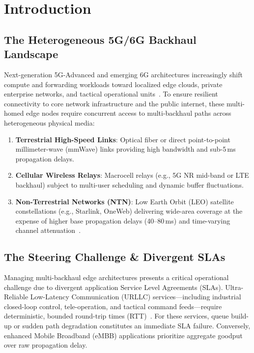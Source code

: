 \documentclass[conference]{IEEEtran}
\begin{document}
\section{Introduction}

\subsection{The Heterogeneous 5G/6G Backhaul Landscape}
Next-generation 5G-Advanced and emerging 6G architectures increasingly shift compute and forwarding workloads toward localized edge clouds, private enterprise networks, and tactical operational units~\cite{etsi_mec_003}. To ensure resilient connectivity to core network infrastructure and the public internet, these multi-homed edge nodes require concurrent access to multi-backhaul paths across heterogeneous physical media:
\begin{enumerate}
    \item \textbf{Terrestrial High-Speed Links}: Optical fiber or direct point-to-point millimeter-wave (mmWave) links providing high bandwidth and sub-5\,ms propagation delays.
    \item \textbf{Cellular Wireless Relays}: Macrocell relays (e.g., 5G NR mid-band or LTE backhaul) subject to multi-user scheduling and dynamic buffer fluctuations.
    \item \textbf{Non-Terrestrial Networks (NTN)}: Low Earth Orbit (LEO) satellite constellations (e.g., Starlink, OneWeb) delivering wide-area coverage at the expense of higher base propagation delays (40--80\,ms) and time-varying channel attenuation~\cite{giordani2020non}.
\end{enumerate}

\subsection{The Steering Challenge \& Divergent SLAs}
Managing multi-backhaul edge architectures presents a critical operational challenge due to divergent application Service Level Agreements (SLAs). Ultra-Reliable Low-Latency Communication (URLLC) services---including industrial closed-loop control, tele-operation, and tactical command feeds---require deterministic, bounded round-trip times (RTT)~\cite{popovski2018wireless}. For these services, queue build-up or sudden path degradation constitutes an immediate SLA failure. Conversely, enhanced Mobile Broadband (eMBB) applications prioritize aggregate goodput over raw propagation delay.
\end{document}
